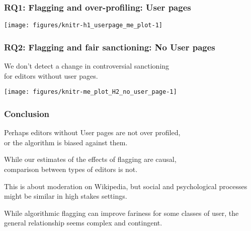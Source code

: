 \documentclass[10pt,xcolor=dvipsnames,aspectratio=169]{beamer}\usepackage[]{graphicx}\usepackage[]{color}
\newenvironment{knitrout}{}{} %
\begin{document}


\begin{frame}\frametitle{RQ1: Flagging and over-profiling: User pages}

\begin{knitrout}
\color{fgcolor}
\texttt{[image: figures/knitr-h1\_userpage\_me\_plot-1]} 

\end{knitrout}

\end{frame}








\begin{frame}\frametitle{RQ2: Flagging and fair sanctioning: No User pages}

\larger

We don't detect a change in controversial sanctioning \\ for editors without user pages. 
  

\texttt{[image: figures/knitr-me\_plot\_H2\_no\_user\_page-1]} 

\end{frame}

\begin{frame}\frametitle{Conclusion}

\larger

  Perhaps editors without User pages are not over profiled, \\ or the algorithm is biased against them. \pause

  While our estimates of the effects of flagging are causal, \\ comparison between types of editors is not. \pause

  This is about moderation on Wikipedia, but social and psychological processes might be similar in high stakes settings. \pause

  While algorithmic flagging can improve fariness for some classes of user, the general relationship seems complex and contingent. \pause

\end{frame}
\end{document}
